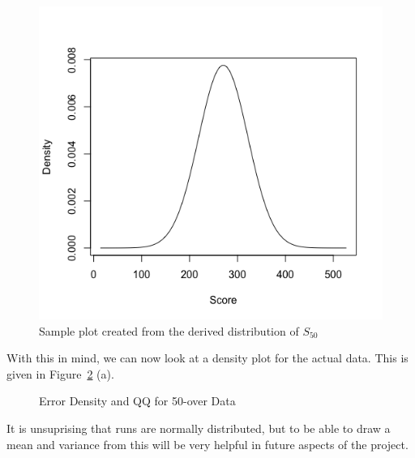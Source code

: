 \begin{figure}[h]
    \centering
    \includegraphics[width=0.4\linewidth]{figures/samplenorm.png}
    \caption{Sample plot created from the derived distribution of $S_{50}$}
    \label{samplenorm}
\end{figure}

With this in mind, we can now look at a density plot for the actual data. This is given in Figure~\ref{errDistAndQQRunsScored} (a).

\begin{figure}[h]
    \centering
    \qquad
    \caption{Error Density and QQ for 50-over Data}
    \label{errDistAndQQRunsScored}
\end{figure}

It is unsuprising that runs are normally distributed, but to be able to draw a mean and variance from this will be very helpful in future aspects of the project.

